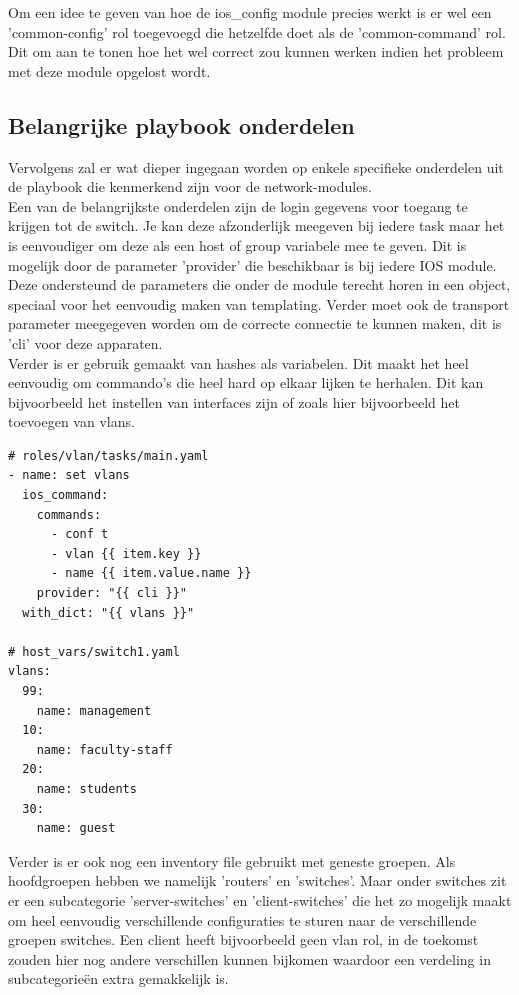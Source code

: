Om een idee te geven van hoe de ios\_config module precies werkt is er wel een 'common-config' rol toegevoegd die hetzelfde doet als de 'common-command' rol. Dit om aan te tonen hoe het wel correct zou kunnen werken indien het probleem met deze module opgelost wordt.

\subsection{Belangrijke playbook onderdelen}
\label{ch:ansibleplaybookonderdelen}
Vervolgens zal er wat dieper ingegaan worden op enkele specifieke onderdelen uit de playbook die kenmerkend zijn voor de network-modules.
\\

Een van de belangrijkste onderdelen zijn de login gegevens voor toegang te krijgen tot de switch. Je kan deze afzonderlijk meegeven bij iedere task maar het is eenvoudiger om deze als een host of group variabele mee te geven. Dit is mogelijk door de parameter 'provider' die beschikbaar is bij iedere IOS module. Deze ondersteund de parameters die onder de module terecht horen in een object, speciaal voor het eenvoudig maken van templating. Verder moet ook de transport parameter meegegeven worden om de correcte connectie te kunnen maken, dit is 'cli' voor deze apparaten.
\\

Verder is er gebruik gemaakt van hashes als variabelen. Dit maakt het heel eenvoudig om commando's die heel hard op elkaar lijken te herhalen. Dit kan bijvoorbeeld het instellen van interfaces zijn of zoals hier bijvoorbeeld het toevoegen van vlans.

\begin{center}
\begin{Verbatim}
# roles/vlan/tasks/main.yaml
- name: set vlans
  ios_command:
    commands:
      - conf t
      - vlan {{ item.key }}
      - name {{ item.value.name }}
    provider: "{{ cli }}"
  with_dict: "{{ vlans }}"
  
# host_vars/switch1.yaml
vlans:
  99:
    name: management
  10:
    name: faculty-staff
  20:
    name: students
  30:
    name: guest
\end{Verbatim}
\end{center}

Verder is er ook nog een inventory file gebruikt met geneste groepen. Als hoofdgroepen hebben we namelijk 'routers' en 'switches'. Maar onder switches zit er een subcategorie 'server-switches' en 'client-switches' die het zo mogelijk maakt om heel eenvoudig verschillende configuraties te sturen naar de verschillende groepen switches. Een client heeft bijvoorbeeld geen vlan rol, in de toekomst zouden hier nog andere verschillen kunnen bijkomen waardoor een verdeling in subcategorieën extra gemakkelijk is.

